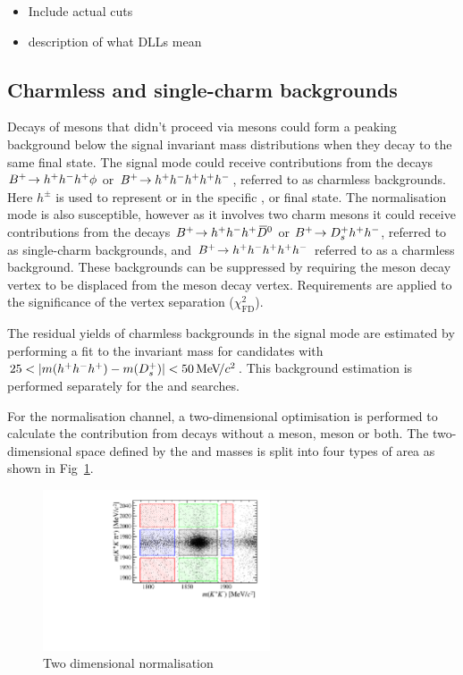 {\color{Red}
\begin{itemize}
\item Include actual cuts
\item description of what DLLs mean
\end{itemize}
}

\subsection{Charmless and single-charm backgrounds}


Decays of \Bp mesons that didn't proceed via \D mesons could form a peaking background below the signal invariant mass distributions when they decay to the same final state.
The signal mode could receive contributions from the decays ${{{B}^+}}\!\rightarrow h^{+}h^{-}h^{+}\phi$ or ${{{B}^+}}\!\rightarrow h^{+}h^{-}h^{+}h^{+}h^{-}$, referred to as charmless backgrounds. Here $h^{\pm}$ is used to represent \Kpm or \pipm in the specific \Dsp, \Dzb or \phiz final state.
The normalisation mode is also susceptible, however as it involves two charm mesons it could receive contributions from the decays ${{{B}^+}}\!\rightarrow h^{+}h^{-}h^{+}{{\kern 0.2em\overline{\kern -0.2em D}{}}{}^0}$ or ${{{B}^+}}\!\rightarrow {\ensuremath{{D}^+_{s}}} h^{+}h^{-}$, referred to as single-charm backgrounds, and ${{{B}^+}}\!\rightarrow h^{+}h^{-}h^{+} h^{+}h^{-}$ referred to as a charmless background.
These backgrounds can be suppressed by requiring the \D meson decay vertex to be displaced from the \Bp meson decay vertex. Requirements are applied to the significance of the vertex separation ($\chi^{2}_{\text{FD}}$).

The residual yields of charmless backgrounds in the signal mode are estimated by performing a fit to the \Bp invariant mass for candidates with $25 < |m(h^{+}h^{-}h^{+}) - m({{D}^+_{s}})| < 50{\mathrm{\,Me\kern -0.1em V\!/}c^2} $. This background estimation is performed separately for the \decay{\Bp}{\Dsp\phiz} and \decay{\Bp}{\Dsp\Kp\Km} searches. 

For the \decay{\Bp}{\Dsp\Dzb} normalisation channel, a two-dimensional optimisation is performed to calculate the contribution from decays without a \Dsp meson, \Dzb meson or both. 
The two-dimensional space defined by the \Dsp and \Dzb masses is split into four types of area as shown in Fig~\ref{fig:2d_normalisation}.

\begin{figure}[!h]
    \centering
        \includegraphics[width=0.6\textwidth]{figs/Selection/B2DsD0_2D_mass_Ds2KKPiRun2.pdf}
        \caption{Two dimensional normalisation}
    \label{fig:2d_normalisation}   
\end{figure}

